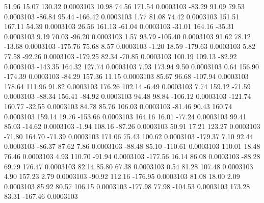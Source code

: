        51.96       15.07      130.32     0.0003103
       10.98       74.56      171.54     0.0003103
      -83.29       91.09       79.53     0.0003103
      -86.84       95.44     -166.42     0.0003103
        1.77       81.08       74.42     0.0003103
      151.51      167.11       54.39     0.0003103
       26.56      161.13      -61.04     0.0003103
      -31.01      164.16      -35.31     0.0003103
        9.19       70.03      -96.20     0.0003103
        1.57       93.79     -105.40     0.0003103
       91.62       78.12      -13.68     0.0003103
     -175.76       75.68        8.57     0.0003103
       -1.20       18.59     -179.63     0.0003103
        5.82       77.58      -92.26     0.0003103
     -179.25       82.34      -70.85     0.0003103
      100.19      109.13      -82.92     0.0003103
     -143.35      164.32      127.74     0.0003103
        7.93      173.94        9.50     0.0003103
        0.64      156.90     -174.39     0.0003103
      -84.29      157.36       11.15     0.0003103
       85.67       96.68     -107.94     0.0003103
      178.64      111.96       91.82     0.0003103
      176.26      102.14       -6.49     0.0003103
        7.74      159.12      -71.59     0.0003103
      -88.34      156.41      -84.92     0.0003103
       94.48       98.84     -106.12     0.0003103
     -121.74      160.77      -32.55     0.0003103
       84.78       85.76      106.03     0.0003103
      -81.46       90.43      160.74     0.0003103
      159.14       19.76     -153.66     0.0003103
      164.16       16.01      -77.24     0.0003103
       99.41       85.03      -14.62     0.0003103
       -1.94      108.16      -87.26     0.0003103
       50.91       17.21      123.27     0.0003103
      -71.80      164.70      -71.39     0.0003103
      171.06       75.43      100.62     0.0003103
     -179.37        7.10       92.44     0.0003103
      -86.37       87.62        7.86     0.0003103
      -88.48       85.10     -110.61     0.0003103
      110.01       18.48       76.46     0.0003103
        4.93      110.70      -91.94     0.0003103
     -177.56       16.14       86.08     0.0003103
      -88.28       69.79      176.47     0.0003103
       82.14       85.80       67.38     0.0003103
        0.54       81.28      107.48     0.0003103
        4.90      157.23        2.79     0.0003103
      -90.92      112.16     -176.95     0.0003103
       81.08       18.00        2.09     0.0003103
       85.92       80.57      106.15     0.0003103
     -177.98       77.98     -104.53     0.0003103
      173.28       83.31     -167.46     0.0003103
